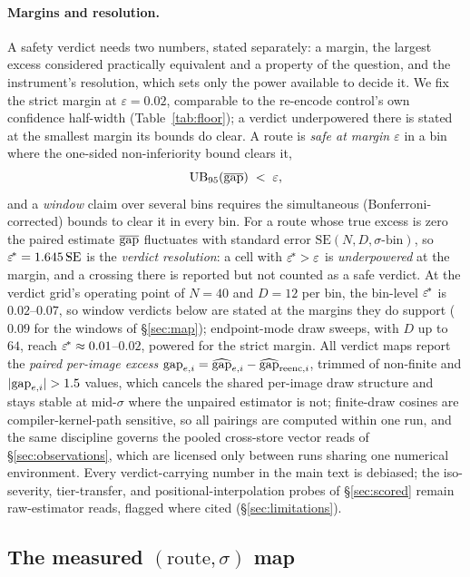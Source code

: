 \paragraph{Margins and resolution.}
A safety verdict needs two numbers, stated separately: a margin, the
largest excess considered practically equivalent and a property of
the question, and the instrument's resolution, which sets only the
power available to decide it. We fix the strict margin at
$\varepsilon = 0.02$, comparable to the re-encode control's own
confidence half-width (Table~\ref{tab:floor}); a verdict underpowered
there is stated at the smallest margin its bounds do clear. A route
is
\emph{safe at margin $\varepsilon$} in a bin where
the one-sided non-inferiority bound clears it,
\begin{equation}
\text{UB}_{95}\!\left(\overline{\mathrm{gap}}\right) \;<\; \varepsilon,
\label{eq:safe}
\end{equation}
and a \emph{window} claim over several bins requires the simultaneous
(Bonferroni-corrected) bounds to clear it in every bin. For a route
whose true excess is zero the paired estimate $\overline{\mathrm{gap}}$ fluctuates with
standard error $\mathrm{SE}(N, D, \sigma\text{-bin})$, so
$\varepsilon^{\!*} = 1.645\,\mathrm{SE}$ is the \emph{verdict
resolution}: a cell with $\varepsilon^{\!*} > \varepsilon$ is
\emph{underpowered} at the margin, and a crossing there is reported
but not counted as a safe verdict. At the verdict grid's operating point of $N{=}40$ and
$D{=}12$ per bin, the bin-level $\varepsilon^{\!*}$ is $0.02$--$0.07$, so
window verdicts below are stated at the margins they do support
($0.09$ for the windows of \S\ref{sec:map});
endpoint-mode draw sweeps, with $D$ up to $64$, reach
$\varepsilon^{\!*} \approx 0.01$--$0.02$, powered for the strict margin. All
verdict maps report the \emph{paired per-image excess}
$\mathrm{gap}_{e,i} = \widehat{\mathrm{gap}}_{e,i} - \widehat{\mathrm{gap}}_{\mathrm{reenc},i}$, trimmed of non-finite
and $|\mathrm{gap}_{e,i}| > 1.5$ values, which cancels the shared per-image
draw structure and stays stable at mid-$\sigma$ where the unpaired
estimator is not; finite-draw cosines are compiler-kernel-path
sensitive, so all pairings are computed within one run, and the same
discipline governs the pooled cross-store vector reads of
\S\ref{sec:observations}, which are licensed only between runs
sharing one numerical environment. Every
verdict-carrying number in the main text is debiased; the
iso-severity, tier-transfer, and positional-interpolation probes of
\S\ref{sec:scored} remain raw-estimator reads, flagged where cited
(\S\ref{sec:limitations}).

\subsection{The measured $(\text{route}, \sigma)$ map}
\label{sec:verdict}
\label{sec:map}

